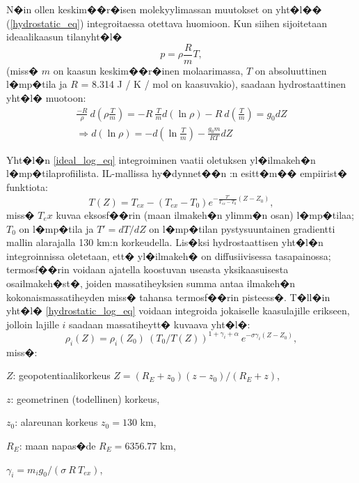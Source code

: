 \documentclass[12pt,a4paper,finnish,margin=2in]{article}
\begin{document}
N�in ollen keskim��r�isen molekyylimassan muutokset on yht�l�� (\ref{hydrostatic_eq}) integroitaessa otettava huomioon. Kun siihen sijoitetaan ideaalikaasun tilanyht�l�
\begin{equation} \label{ideal_eq}
p = \rho \frac{R}{m} T,
\end{equation}
(miss� $m$ on kaasun keskim��r�inen molaarimassa, $T$ on absoluuttinen l�mp�tila ja $R$ = 8.314 J / K / mol on kaasuvakio), saadaan hydrostaattinen yht�l� muotoon:
\begin{align} \label{hydrostatic_log_eq}
\frac{-R}{\rho}~d \left ( \rho \frac{T}{m} \right ) = -R~\frac{T}{m} d(\ln \rho) - R~d \left ( \frac{T}{m} \right ) = g_0 dZ \nonumber \\
\Rightarrow  d(\ln \rho) = - d \left ( \ln \frac{T}{m} \right ) - \frac{g_0 m}{R T} dZ
\end{align}

Yht�l�n \ref{ideal_log_eq} integroiminen vaatii oletuksen yl�ilmakeh�n l�mp�tilaprofiilista. IL-mallissa hy�dynnet��n \citet{walker_1965}:n esitt�m�� empiirist� funktiota:
\begin{equation} \label{bates_eq}
T(Z) = T_{ex} - (T_{ex} - T_0) e^{- \frac{T'}{T_{ex} - T_0} (Z-Z_0)},
\end{equation}
miss� $T_ex$ kuvaa eksosf��rin (maan ilmakeh�n ylimm�n osan) l�mp�tilaa; $T_0$ on l�mp�tila ja $T' = dT/dZ$ on l�mp�tilan pystysuuntainen gradientti mallin alarajalla 130 km:n korkeudella. Lis�ksi hydrostaattisen yht�l�n integroinnissa oletetaan, ett� yl�ilmakeh� on diffusiivisessa tasapainossa; termosf��rin voidaan ajatella koostuvan useasta yksikaasuisesta osailmakeh�st�, joiden massatiheyksien summa antaa ilmakeh�n kokonaismassatiheyden miss� tahansa termosf��rin pisteess�. T�ll�in yht�l� \ref{hydrostatic_log_eq} voidaan integroida jokaiselle kaasulajille erikseen, jolloin lajille $i$ saadaan massatiheytt� kuvaava yht�l�:
\begin{equation} \label{species_dens_eq}
\rho_i (Z) = \rho_i (Z_0)~(T_0 / T(Z))^{1+\gamma_i+\alpha}~e^{-\sigma \gamma_i (Z-Z_0)},
\end{equation}
miss�:

$Z$: geopotentiaalikorkeus $Z = (R_E + z_0)(z-z_0)/(R_E + z)$,

$z$: geometrinen (todellinen) korkeus,

$z_0$: alareunan korkeus $z_0 = 130$ km,

$R_E$: maan napas�de $R_E = 6356.77$ km,

$\gamma_i = m_i g_0/(\sigma~R~T_{ex})$,
\end{document}
